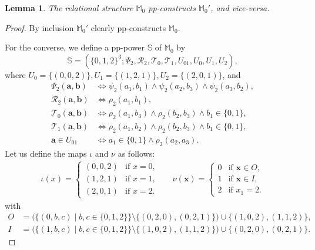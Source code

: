 \documentclass[12pt]{amsart}
\newtheorem{lemma}[theorem]{Lemma}
\theoremstyle{definition}
\theoremstyle{definition}
\newcommand{\struct}[1]{\mathbb{#1}}
\begin{document}
\begin{lemma}\label{lem:forTheLastCollapse}
The relational structure $\struct{M}_0$ pp-constructs $\struct{M}_0'$, and vice-versa.
\end{lemma}
\begin{proof}
By inclusion $\struct{M}_0'$ clearly pp-constructs $\struct{M}_0$. 

For the converse, we define a pp-power $\struct{S}$ of $\struct{M}_0$ by
\[\struct{S} = (\{0,1,2\}^3;\Psi_2,\mathcal R_2,\mathcal T_0,\mathcal T_1,U_{01},U_0,U_1,U_2),
\]
where $U_0 =  \{(0,0,2)\}, U_1 = \{(1,2,1)\}, U_2 = \{(2,0,1)\}$, and
\begin{align*}
    \Psi_2(\boldsymbol{a},\boldsymbol{b}) &\Leftrightarrow \psi_2(a_1,b_1)\wedge \psi_2(a_2,b_3)\wedge \psi_2(a_3,b_2),
    \\\mathcal R_2(\boldsymbol{a},\boldsymbol{b}) &\Leftrightarrow \rho_2(a_1,b_1),
    \\\mathcal T_0(\boldsymbol{a},\boldsymbol{b}) &\Leftrightarrow \rho_2(a_1,b_3)\wedge \rho_2(b_2,b_3)\wedge b_1\in\{0,1\},
    \\\mathcal T_1(\boldsymbol{a},\boldsymbol{b}) &\Leftrightarrow \rho_2(a_1,b_2)\wedge \rho_2(b_2,b_3)\wedge b_1\in\{0,1\},
    \\ \boldsymbol{a}\in U_{01} &\Leftrightarrow a_1\in\{0,1\}\wedge \rho_2(a_2,a_3).
\end{align*}
Let us define the maps $\iota$ and $\nu$ as follows:
\begin{align*}\label{equation:maph}
 \iota(x)=\begin{cases}
   (0,0,2) & \text{if } x = 0,\\
   (1,2,1) & \text{if } x = 1,\\
   (2,0,1) & \text{if } x = 2.
   \end{cases}
&&\nu(\boldsymbol{x})=\begin{cases}
   0 & \text{if } \boldsymbol{x}\in O,\\
   1 & \text{if } \boldsymbol{x}\in I,\\
   2 & \text{if } x_1 = 2.
   \end{cases}
\end{align*}
with
\begin{align*}
    O &= \Big(\{(0,b,c)\mid b,c\in\{0,1,2\}\}\setminus \{(0,2,0), (0,2,1)\}\Big) \cup \{(1,0,2), (1,1,2)\},
    \\I &= \Big(\{(1,b,c)\mid b,c\in\{0,1,2\}\}\setminus \{(1,0,2), (1,1,2)\}\Big) \cup \{(0,2,0), (0,2,1)\}.
\end{align*}


\end{proof}
\end{document}
